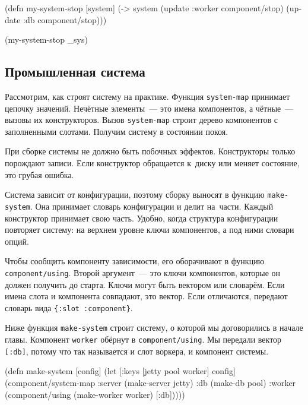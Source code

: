\begin{english}
  \begin{clojure}
(defn my-system-stop
  [system]
  (-> system
      (update :worker component/stop)
      (update :db component/stop)))

(my-system-stop _sys)
  \end{clojure}
\end{english}

\subsection{Промышленная система}


Рассмотрим, как строят систему на практике. Функция \verb|system-map| принимает
цепочку значений. Нечётные элементы~--- это имена компонентов, а чётные~--- вызовы
их конструкторов. Вызов \verb|system-map| строит дерево компонентов с
заполненными слотами. Получим систему в состоянии покоя.


При сборке системы не должно быть побочных эффектов. Конструкторы только
порождают записи. Если конструктор обращается к~диску или меняет состояние, это
грубая ошибка.

Система зависит от конфигурации, поэтому сборку выносят в функцию
\verb|make-system|. Она принимает словарь конфигурации и делит на~части. Каждый
конструктор принимает свою часть. Удобно, когда структура конфигурации повторяет
систему: на верхнем уровне ключи компонентов, а под ними словари опций.

Чтобы сообщить компоненту зависимости, его оборачивают в функцию
\verb|component/using|. Второй аргумент~--- это ключи компонентов, которые он
должен получить до старта. Ключи могут быть вектором или словарём. Если имена
слота и компонента совпадают, это вектор. Если отличаются, передают словарь вида
\verb|{:slot :component}|.

Ниже функция \verb|make-system| строит систему, о которой мы договорились в
начале главы. Компонент \verb|worker| обёрнут в \verb|component/using|. Мы
передали вектор \verb|[:db]|, потому что так называется и слот воркера, и
компонент системы.

\ifx\DEVICETYPE\MOBILE

\begin{english}
  \begin{clojure}
(defn make-system
  [config]
  (let [{:keys [jetty pool worker]}
        config]
    (component/system-map
     :server (make-server jetty)
     :db     (make-db pool)
     :worker (component/using
               (make-worker worker)
               [:db]))))
  \end{clojure}
\end{english}

